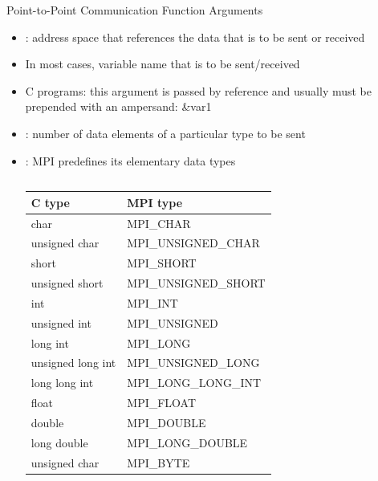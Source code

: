 \documentclass[9pt,c]{beamer}
\begin{document}
\begin{frame}{Point-to-Point Communication Function Arguments}
  \begin{itemize}
    \item {}: address space that references the data that is to be sent or received
    \item[] In most cases, variable name that is to be sent/received
    \item[] C programs: this argument is passed by reference and usually must be prepended with an ampersand: \&var1
    \item {}: number of data elements of a particular type to be sent
    \item {}: MPI predefines its elementary data types
      \begin{columns}
        {\footnotesize
          \begin{center}
            \begin{tabular}{|f|f|}
              \hline
              C type  &   MPI type \\
              \hline
              char &   MPI\_CHAR \\
              unsigned char &   MPI\_UNSIGNED\_CHAR \\
              short &   MPI\_SHORT \\
              unsigned short &   MPI\_UNSIGNED\_SHORT \\
              int &   MPI\_INT \\
              unsigned int &   MPI\_UNSIGNED \\
              long int  &  MPI\_LONG \\
              unsigned long int &   MPI\_UNSIGNED\_LONG \\
              long long int  &  MPI\_LONG\_LONG\_INT \\
              float  &  MPI\_FLOAT \\
              double &   MPI\_DOUBLE \\
              long double &   MPI\_LONG\_DOUBLE \\
              unsigned char &   MPI\_BYTE \\
              \hline
            \end{tabular}
          \end{center}
          }
        {\footnotesize
          \begin{center}

\end{center}}
\end{columns}
\end{itemize}
\end{frame}
\end{document}
